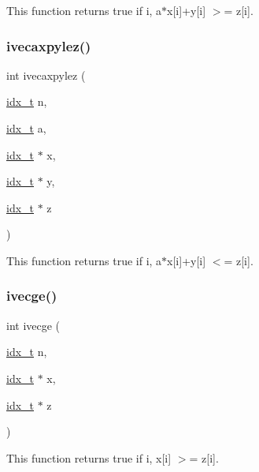This function returns true if  i, a$\ast$x\mbox{[}i\mbox{]}+y\mbox{[}i\mbox{]} $>$= z\mbox{[}i\mbox{]}. \mbox{\label{a00945_a7a81166f41883548c3db20188df00b72}} 
\subsubsection{\texorpdfstring{ivecaxpylez()}{ivecaxpylez()}}
{\footnotesize\ttfamily int ivecaxpylez (\begin{DoxyParamCaption}\item[{\hyperlink{a00876_aaa5262be3e700770163401acb0150f52}{idx\+\_\+t}}]{n,  }\item[{\hyperlink{a00876_aaa5262be3e700770163401acb0150f52}{idx\+\_\+t}}]{a,  }\item[{\hyperlink{a00876_aaa5262be3e700770163401acb0150f52}{idx\+\_\+t} $\ast$}]{x,  }\item[{\hyperlink{a00876_aaa5262be3e700770163401acb0150f52}{idx\+\_\+t} $\ast$}]{y,  }\item[{\hyperlink{a00876_aaa5262be3e700770163401acb0150f52}{idx\+\_\+t} $\ast$}]{z }\end{DoxyParamCaption})}

This function returns true if  i, a$\ast$x\mbox{[}i\mbox{]}+y\mbox{[}i\mbox{]} $<$= z\mbox{[}i\mbox{]}. \mbox{\label{a00945_a48a007c5755fd14628488b26f7db7201}} 
\subsubsection{\texorpdfstring{ivecge()}{ivecge()}}
{\footnotesize\ttfamily int ivecge (\begin{DoxyParamCaption}\item[{\hyperlink{a00876_aaa5262be3e700770163401acb0150f52}{idx\+\_\+t}}]{n,  }\item[{\hyperlink{a00876_aaa5262be3e700770163401acb0150f52}{idx\+\_\+t} $\ast$}]{x,  }\item[{\hyperlink{a00876_aaa5262be3e700770163401acb0150f52}{idx\+\_\+t} $\ast$}]{z }\end{DoxyParamCaption})}

This function returns true if  i, x\mbox{[}i\mbox{]} $>$= z\mbox{[}i\mbox{]}. \mbox{\label{a00945_a29ab1dff40529cc72ad264f548e5661b}} 
